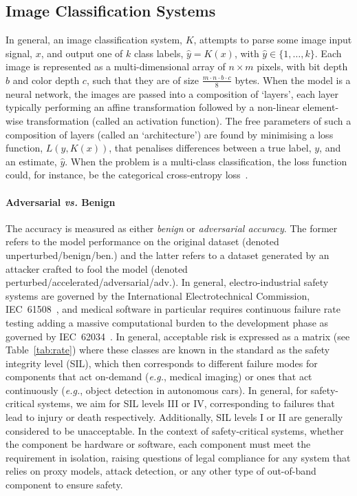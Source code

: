 \documentclass[journal]{IEEEtran}
\begin{document}
\subsection{Image Classification Systems}
\label{classification}
In general, an image classification system, $K$, attempts to parse some image input signal, $x$, and output one of $k$ class labels, $\hat{y} = K(x)$, with $\hat{y} \in \{1,\ldots,k\}$.
Each image is represented as a multi-dimensional array of $n\times m$ pixels, with bit depth $b$ and color depth $c$, such that they are of size $\frac{m \cdot n \cdot b \cdot c}{8}$ bytes.
When the model is a neural network, the images are passed into a composition of `layers', each layer typically performing an affine transformation followed by a non-linear element-wise transformation (called an activation function).
The free parameters of such a composition of layers (called an `architecture') are found by minimising a loss function, $L(y,K(x))$, that penalises differences between a true label, $y$, and an estimate, $\hat{y}$.
When the problem is a multi-class classification, the loss function could, for instance, be the categorical cross-entropy loss~\cite{biggio_evasion_2013,tsipras_robustness_2019,croce_reliable_2020,carlini_towards_2017}.

\paragraph{Adversarial \textit{vs.} Benign}

The accuracy is measured as either \textit{benign} or \textit{adversarial accuracy}.
The former refers to the model performance on the original dataset (denoted unperturbed/benign/ben.) and the latter refers to a dataset generated by an attacker crafted to fool the model (denoted perturbed/accelerated/adversarial/adv.).
In general, electro-industrial safety systems are governed by the International Electrotechnical Commission, IEC~61508~\cite{IEC61508}, and medical software in particular requires continuous failure rate testing adding a massive computational burden to the development phase as governed by IEC~62034~\cite{IEC62034}.
In general, acceptable risk is expressed as a matrix (see Table~\ref{tab:rate}) where these classes are known in the standard as the safety integrity level (SIL), which then corresponds to different failure modes for components that act on-demand (\textit{e.g.}, medical imaging) or ones that act continuously (\textit{e.g.}, object detection in autonomous cars).
In general, for safety-critical systems, we aim for SIL levels III or IV, corresponding to failures that lead to injury or death respectively.
Additionally, SIL levels I or II are generally considered to be unacceptable.
In the context of safety-critical systems, whether the component be hardware or software, each component must meet the requirement in isolation, raising questions of legal compliance for any system that relies on proxy models, attack detection, or any other type of out-of-band component to ensure safety.
\end{document}
